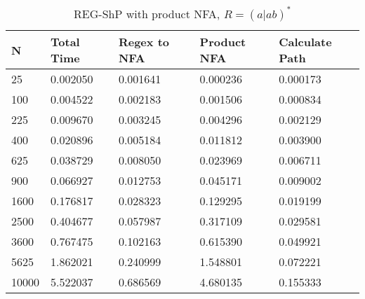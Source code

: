 \documentclass[]{article}
\numberwithin{equation}{section}
\begin{document}
\begin{appendices}
\begin{table}[H]
	\centering
	\small
	\setlength\tabcolsep{2pt}
	\begin{tabular}{|l|l|l|l|l|}
		\hline
		N     & Total Time & Regex to NFA & Product NFA & Calculate Path \\ \hline
		25    & 0.002050   & 0.001641     & 0.000236    & 0.000173       \\ \hline
		100   & 0.004522   & 0.002183     & 0.001506    & 0.000834       \\ \hline
		225   & 0.009670   & 0.003245     & 0.004296    & 0.002129       \\ \hline
		400   & 0.020896   & 0.005184     & 0.011812    & 0.003900       \\ \hline
		625   & 0.038729   & 0.008050     & 0.023969    & 0.006711       \\ \hline
		900   & 0.066927   & 0.012753     & 0.045171    & 0.009002       \\ \hline
		1600  & 0.176817   & 0.028323     & 0.129295    & 0.019199       \\ \hline
		2500  & 0.404677   & 0.057987     & 0.317109    & 0.029581       \\ \hline
		3600  & 0.767475   & 0.102163     & 0.615390    & 0.049921       \\ \hline
		5625  & 1.862021   & 0.240999     & 1.548801    & 0.072221       \\ \hline
		10000 & 5.522037   & 0.686569     & 4.680135    & 0.155333       \\ \hline
	\end{tabular}
	\caption{REG-ShP with product NFA, $R = (a|ab)^*$}
\end{table}


\end{appendices}
\end{document}
